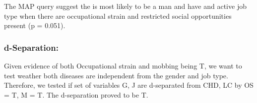 The MAP query suggest the is most likely to be a man and have and active job type when there are occupational strain and restricted social opportunities present (p = 0.051).

\subsubsection{d-Separation:}
Given evidence of both Occupational strain and mobbing being T, we want to test weather both diseases are independent from the gender and job type.  Therefore, we tested if set of variables {G, J} are d-separated from {CHD, LC} by {OS = T, M = T}. The d-separation proved to be T. 













